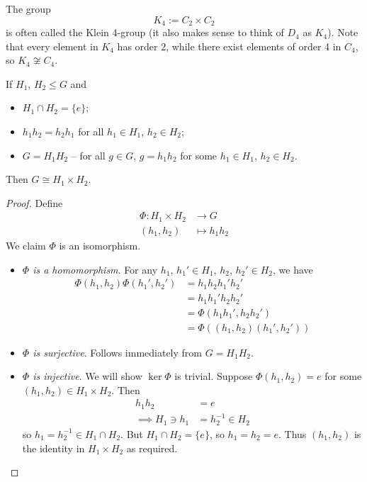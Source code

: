 \documentclass{../template/note}
\begin{document}
    \begin{example*}
        The group
        \[
            K_4 := C_2 \times C_2
        \]
        is often called the Klein 4-group (it also makes sense to think of \(D_4\) as \(K_4\)). Note that every element in \(K_4\) has order 2, while there exist elements of order 4 in \(C_4\), so \(K_4 \not\cong C_4\).
    \end{example*}

    \begin{theorem}
        If \(H_1\), \(H_2 \leq G\) and
        \begin{itemize}
            \item \(H_1 \cap H_2 = \{e\}\);
            \item \(h_1h_2 = h_2h_1\) for all \(h_1 \in H_1\), \(h_2 \in H_2\);
            \item \(G = H_1H_2\) -- for all \(g \in G\), \(g = h_1h_2\) for some \(h_1 \in H_1\), \(h_2 \in H_2\).
        \end{itemize}
        Then \(G \cong H_1 \times H_2\).
        \label{direct-product-theorem}
    \end{theorem}
    
    \begin{proof}
        Define
        \begin{align*}
            \Phi: H_1 \times H_2 &\to G \\
            (h_1, h_2) &\mapsto h_1h_2
        \end{align*}
        We claim \(\Phi\) is an isomorphism.
        \begin{itemize}
            \item \emph{\(\Phi\) is a homomorphism}. For any \(h_1\), \(h_1' \in H_1\), \(h_2\), \(h_2' \in H_2\), we have
            \begin{align*}
                \Phi(h_1, h_2)\Phi(h_1', h_2') &= h_1h_2h_1'h_2' \\
                &= h_1h_1'h_2h_2' \\
                &= \Phi(h_1h_1', h_2h_2') \\
                &= \Phi((h_1, h_2)(h_1', h_2'))
            \end{align*}
            \item \emph{\(\Phi\) is surjective}. Follows immediately from \(G = H_1H_2\).
            \item \emph{\(\Phi\) is injective}. We will show \(\ker \Phi\) is trivial. Suppose \(\Phi(h_1, h_2) = e\) for some \((h_1, h_2) \in H_1 \times H_2\). Then
            \begin{align*}
                h_1h_2 &= e \\
                \implies H_1 \ni h_1 &= h_2^{-1} \in H_2
            \end{align*}
            so \(h_1 = h_2^{-1} \in H_1 \cap H_2\). But \(H_1 \cap H_2 = \{e\}\), so \(h_1 = h_2 = e\). Thus \((h_1, h_2)\) is the identity in \(H_1 \times H_2\) as required.            
        \end{itemize}
    \end{proof}
    
\end{document}
